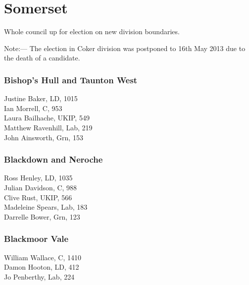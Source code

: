 \documentclass[a4paper,openany,10pt]{book}
\begin{document}
\vfill

\section{Somerset}

Whole council up for election on new division boundaries.

Note:--- The election in Coker division was postponed to 16th May 2013 due to the death of a candidate.



\subsubsection*{Bishop's Hull and Taunton West}



Justine Baker, LD, 1015\\
Ian Morrell, C, 953\\
Laura Bailhache, UKIP, 549\\
Matthew Ravenhill, Lab, 219\\
John Ainsworth, Grn, 153\\


\subsubsection*{Blackdown and Neroche}



Ross Henley, LD, 1035\\
Julian Davidson, C, 988\\
Clive Rust, UKIP, 566\\
Madeleine Spears, Lab, 183\\
Darrelle Bower, Grn, 123\\


\subsubsection*{Blackmoor Vale}



William Wallace, C, 1410\\
Damon Hooton, LD, 412\\
Jo Penberthy, Lab, 224\\
\end{document}
